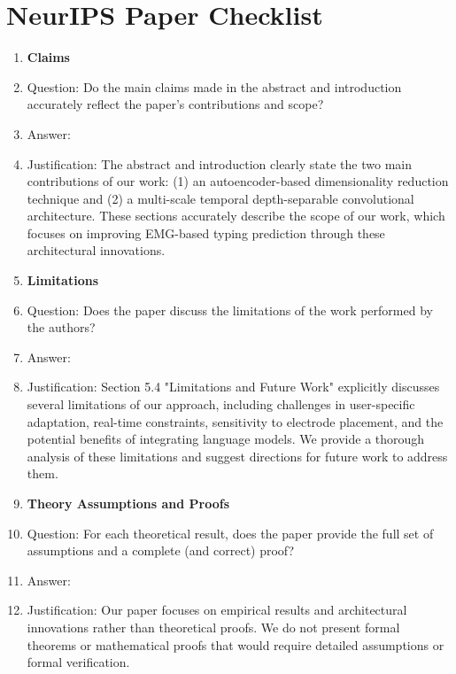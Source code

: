 \section*{NeurIPS Paper Checklist}

\begin{enumerate}

\item {\bf Claims}
    \item[] Question: Do the main claims made in the abstract and introduction accurately reflect the paper's contributions and scope?
    \item[] Answer: \answerYes{}
    \item[] Justification: The abstract and introduction clearly state the two main contributions of our work: (1) an autoencoder-based dimensionality reduction technique and (2) a multi-scale temporal depth-separable convolutional architecture. These sections accurately describe the scope of our work, which focuses on improving EMG-based typing prediction through these architectural innovations.

\item {\bf Limitations}
    \item[] Question: Does the paper discuss the limitations of the work performed by the authors?
    \item[] Answer: \answerYes{}
    \item[] Justification: Section 5.4 "Limitations and Future Work" explicitly discusses several limitations of our approach, including challenges in user-specific adaptation, real-time constraints, sensitivity to electrode placement, and the potential benefits of integrating language models. We provide a thorough analysis of these limitations and suggest directions for future work to address them.

\item {\bf Theory Assumptions and Proofs}
    \item[] Question: For each theoretical result, does the paper provide the full set of assumptions and a complete (and correct) proof?
    \item[] Answer: \answerNA{}
    \item[] Justification: Our paper focuses on empirical results and architectural innovations rather than theoretical proofs. We do not present formal theorems or mathematical proofs that would require detailed assumptions or formal verification.


\end{enumerate}
